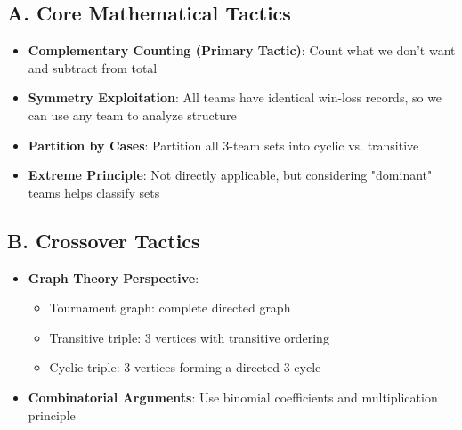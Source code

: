 \documentclass[]{article}
\begin{document}
\begin{tacticalbox}
\subsection*{A. Core Mathematical Tactics}
\begin{itemize}[leftmargin=*]
    \item \textbf{Complementary Counting (Primary Tactic)}: Count what we don't want and subtract from total
    \item \textbf{Symmetry Exploitation}: All teams have identical win-loss records, so we can use any team to analyze structure
    \item \textbf{Partition by Cases}: Partition all 3-team sets into cyclic vs. transitive
    \item \textbf{Extreme Principle}: Not directly applicable, but considering "dominant" teams helps classify sets
\end{itemize}

\subsection*{B. Crossover Tactics}
\begin{itemize}[leftmargin=*]
    \item \textbf{Graph Theory Perspective}: 
    \begin{itemize}
        \item Tournament graph: complete directed graph
        \item Transitive triple: 3 vertices with transitive ordering
        \item Cyclic triple: 3 vertices forming a directed 3-cycle
    \end{itemize}
    \item \textbf{Combinatorial Arguments}: Use binomial coefficients and multiplication principle
\end{itemize}
\end{tacticalbox}
\end{document}
